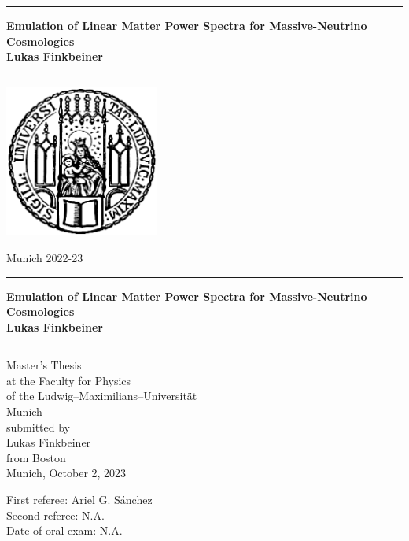 \documentclass[12pt]{book}
\newcommand{\LMUTitle}[9]{
  \thispagestyle{empty}
  \vspace*{\stretch{1}}
  {\parindent0cm
   \rule{\linewidth}{.7ex}}
  \begin{flushright}

    \vspace*{\stretch{1}}
    \sffamily\bfseries\Huge
    #1\\
    \vspace*{\stretch{1}}
    \sffamily\bfseries\large
    #2
    \vspace*{\stretch{1}}
  \end{flushright}
  \rule{\linewidth}{.7ex}
  \vspace*{\stretch{5}}
  \begin{center}
    \includegraphics[width=2in]{siegel}
  \end{center}
  \vspace*{\stretch{1}}
  \begin{center}\sffamily\LARGE{#5}\end{center}
  \newpage
  \thispagestyle{empty}

  \cleardoublepage
  \thispagestyle{empty}

  \vspace*{\stretch{1}}
  {\parindent0cm
  \rule{\linewidth}{.7ex}}
  \begin{flushright}
    \vspace*{\stretch{1}}
    \sffamily\bfseries\Huge
    #1\\
    \vspace*{\stretch{1}}
    \sffamily\bfseries\large
    #2
    \vspace*{\stretch{1}}
  \end{flushright}
  \rule{\linewidth}{.7ex}

  \vspace*{\stretch{3}}
  \begin{center}
    \Large Master's Thesis\\
    \Large at the #4\\
    \Large of the Ludwig--Maximilians--Universit\"at\\
    \Large Munich\\
    \vspace*{\stretch{1}}
    \Large submitted by\\
    \Large #2\\
    \Large from #3\\
    \vspace*{\stretch{2}}
    \Large Munich, #6
  \end{center}

  \newpage
  \thispagestyle{empty}

  \vspace*{\stretch{1}}

  \begin{flushleft}
    \large First referee:  #7 \\[1mm]
    \large Second referee: #8 \\[1mm]
    \large Date of oral exam: #9\\
  \end{flushleft}

  \cleardoublepage
}
\begin{document}
  \frontmatter
  \VerbatimFootnotes

  \LMUTitle %
      {Emulation of Linear Matter Power Spectra for Massive-Neutrino Cosmologies}               %
      {Lukas Finkbeiner}                       %
      {Boston}                             %
      {Faculty for Physics}                         %
      {Munich 2022-23}                          %
      {October 2, 2023}                            %
      {Ariel G. S\'{a}nchez}                      %
      {N.A.}                         %
      {N.A.}                         %



  \tableofcontents


  \listoffigures


  \listoftables
  \cleardoublepage


  


  \mainmatter\setcounter{page}{1}
  
  
  
  
  
  


  \backmatter
  
  \markboth{}{}


  


  
\end{document}
